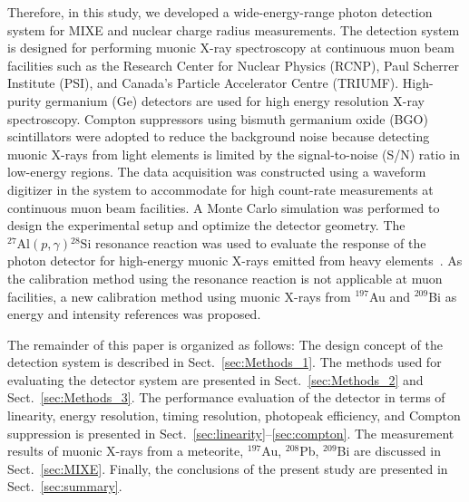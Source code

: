Therefore, in this study, we developed a wide-energy-range photon detection system for MIXE and nuclear charge radius measurements. 
The detection system is designed for performing muonic X-ray spectroscopy at continuous muon beam facilities such as the Research Center for Nuclear Physics (RCNP), Paul Scherrer Institute (PSI), and Canada's Particle Accelerator Centre (TRIUMF).
High-purity germanium (Ge) detectors are used for high energy resolution X-ray spectroscopy. %
Compton suppressors using bismuth germanium oxide (BGO) scintillators were adopted to reduce the background noise because detecting muonic X-rays from light elements is limited by the signal-to-noise (S/N) ratio in low-energy regions.
The data acquisition was constructed using a waveform digitizer in the system to accommodate for high count-rate measurements at continuous muon beam facilities. 
A Monte Carlo simulation was performed to design the experimental setup and optimize the detector geometry. 
The $^{27}\mathrm{Al}(p,\gamma){}^{28}\mathrm{Si}$ resonance reaction was used to evaluate the response of the photon detector for high-energy muonic X-rays emitted from heavy elements~\cite{Mizuno2023-px}. 
As the calibration method using the resonance reaction is not applicable at muon facilities, a new calibration method using muonic X-rays from $^{197}$Au and $^{209}$Bi as energy and intensity references was proposed. 


The remainder of this paper is organized as follows: 
The design concept of the detection system is described in Sect.~\ref{sec:Methods_1}. 
The methods used for evaluating the detector system are presented in Sect.~\ref{sec:Methods_2} and Sect.~\ref{sec:Methods_3}. 
The performance evaluation of the detector in terms of linearity, energy resolution, timing resolution, photopeak efficiency, and Compton suppression is presented in Sect.~\ref{sec:linearity}--\ref{sec:compton}.
The measurement results of muonic X-rays from a meteorite, $^{197}$Au, $^{208}$Pb, $^{209}$Bi are discussed in Sect.~\ref{sec:MIXE}. 
Finally, the conclusions of the present study are presented in Sect.~\ref{sec:summary}.
